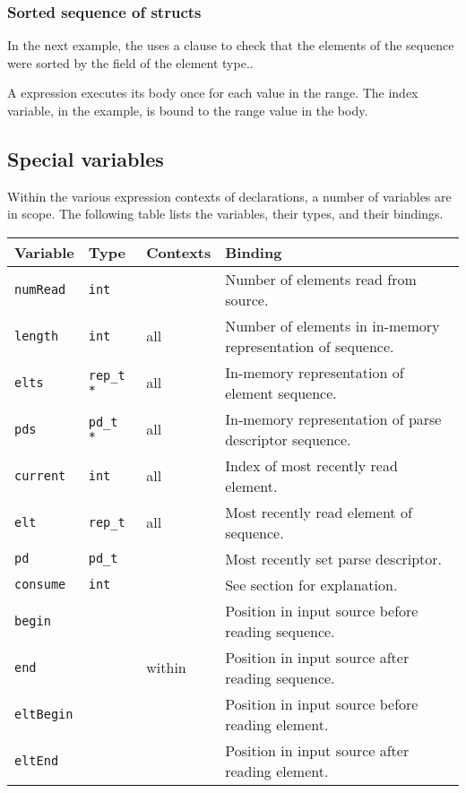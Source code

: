 \subsubsection{Sorted sequence of structs}
In the next example, the \Parray{}  uses a \Pwhere{}
clause to check that the elements of the sequence were sorted by the
 field of the element type..

%
\noindent
A \Pforall{} expression executes its body once for each value in the
range. The index variable,  in the example, is bound to the
range value in the body.

\subsection{Special variables}
\label{sec:special-variables}
Within the various expression contexts of \Parray{} declarations, a
number of variables are in scope.  The following table lists the
variables, their types, and their bindings.

\myvskip{1ex}
\begin{center}
\begin{tabular}{|l|l|l|l|}
\hline
Variable & Type & Contexts & Binding \\\hline \hline
\texttt{numRead}  & \texttt{int}     & \Pparsecheck{} & Number of elements read from source. \\ \hline
\texttt{length}   & \texttt{int}     & all & Number of elements in in-memory representation of sequence.\\ \hline
\texttt{elts}     & \texttt{rep\_t *}& all & In-memory representation of element sequence. \\ \hline
\texttt{pds}      & \texttt{pd\_t *} & all & In-memory representation of parse descriptor sequence. \\ \hline
\texttt{current}  & \texttt{int}     & all & Index of most recently read element.  \\ \hline
\texttt{elt}      & \texttt{rep\_t}  & all & Most recently read element of sequence. \\ \hline
\texttt{pd}       & \texttt{pd\_t}   & \Pparsecheck{} & Most recently set  parse descriptor. \\ \hline
\texttt{consume}  & \texttt{int}     & \Pended{} & See \Pended{} section for explanation. \\ \hline
\texttt{begin}    & \Ppost{}         & \Pparsecheck{} & Position in input source before reading sequence. \\ \hline
\texttt{end}      & \Ppost{}         & \Pparsecheck{} within \Pwhere{} & Position in input source after reading sequence. \\ \hline
\texttt{eltBegin}& \Ppost{}         & \Pparsecheck{} & Position in input source before reading element. \\ \hline
\texttt{eltEnd}  & \Ppost{}         & \Pparsecheck{} & Position in input source after reading element. \\ \hline
\end{tabular}
\end{center}
\myvskip{1ex}

